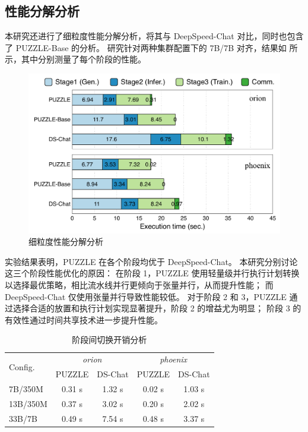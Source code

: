\subsection{性能分解分析}  

本研究还进行了细粒度性能分解分析，将其与 DeepSpeed-Chat 对比，同时也包含了 PUZZLE-Base 的分析。
研究针对两种集群配置下的 7B/7B 对齐，结果如 所示，其中分别测量了每个阶段的性能。  

\begin{figure}[t]
     \centering
     \includegraphics[width=0.7\linewidth]{figures/puzzle/perf-breakdown.pdf}
     \caption{细粒度性能分解分析}
     \label{fig:perf-breakdown}
\end{figure}

实验结果表明，PUZZLE 在各个阶段均优于 DeepSpeed-Chat。
本研究分别讨论这三个阶段性能优化的原因：
在阶段 1，PUZZLE 使用轻量级并行执行计划转换以选择最优策略，相比流水线并行更倾向于张量并行，从而提升性能；
而 DeepSpeed-Chat 仅使用张量并行导致性能较低。
对于阶段 2 和 3，PUZZLE 通过选择合适的放置和执行计划实现显著提升，阶段 2 的增益尤为明显；
阶段 3 的有效性通过时间共享技术进一步提升性能。  

\begin{table}[h]
\caption{阶段间切换开销分析}
\label{table:switch-overhead}
\centering
\small
\begin{tabular}{lcccc}
\toprule
\multirow{2}{*}{Config.} & \multicolumn{2}{c}{\textit{orion}} & \multicolumn{2}{c}{\textit{phoenix}} \\ %
           & PUZZLE & DS-Chat       & PUZZLE  & DS-Chat       \\ \hline
7B/350M    &  0.31 s     & 1.32 s        & 0.02 s       & 1.03 s        \\
13B/350M   &  0.37 s     & 3.02 s        & 0.20 s       & 2.02 s        \\
33B/7B   &  0.49 s     & 7.54 s        & 0.48 s       & 3.37 s        \\ \bottomrule
\end{tabular}
\end{table}

